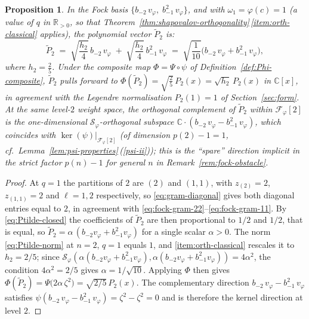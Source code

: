 \documentclass[12pt]{amsart}
\theoremstyle{plain}
\newtheorem{proposition}[theorem]{Proposition}
\theoremstyle{definition}
\newcommand{\CC}{\mathbb{C}}
\newcommand{\RR}{\mathbb{R}}
\newcommand{\Sf}{\mathcal{S}_\varphi} %
\newcommand{\vf}{v_\varphi}           %
\begin{document}
\begin{proposition}
\label{prop:fock-P2}
In the Fock basis $\{b_{-2}\,\vf,\; b_{-1}^2\,\vf\}$, and with
$\omega_1 = \varphi(c) = 1$ (a value of $q$ in $\RR_{>0}$, so that
Theorem~\ref{thm:shapovalov-orthogonality}\,\ref{item:orth-classical}
applies), the polynomial vector $\tilde{P}_2$ is:
\begin{equation}
\label{eq:fock-P2}
  \tilde{P}_2
  \;=\;
  \sqrt{\frac{h_2}{4}}\,b_{-2}\,\vf
  \;+\;
  \sqrt{\frac{h_2}{4}}\,b_{-1}^2\,\vf
  \;=\;
  \sqrt{\frac{1}{10}}\bigl(b_{-2}\,\vf + b_{-1}^2\,\vf\bigr),
\end{equation}
where $h_2 = \frac{2}{5}$. Under the composite map $\Phi=\Psi\circ\psi$
of Definition~\ref{def:Phi-composite}, $\tilde{P}_2$ pulls forward to
$\Phi(\tilde{P}_2) = \sqrt{\tfrac{2}{5}}\,P_2(x) = \sqrt{h_2}\,P_2(x)$
in $\CC[x]$, in agreement with the Legendre normalisation
$P_2(1) = 1$ of Section~\ref{sec:form}.
At the same level-$2$ weight space, the orthogonal complement of
$\tilde{P}_2$ within $\mathcal{F}_\varphi[2]$ is the one-dimensional
$\Sf$-orthogonal subspace
$\CC\cdot(b_{-2}\,\vf - b_{-1}^2\,\vf)$, which coincides with
$\ker(\psi)|_{\mathcal{F}_\varphi[2]}$
(of dimension $p(2)-1 = 1$, cf.\
Lemma~\ref{lem:psi-properties}\,(\ref{psi-ii}));
this is the ``spare'' direction implicit in the strict factor
$p(n)-1$ for general $n$ in Remark~\ref{rem:fock-obstacle}.
\end{proposition}
\begin{proof}
At $q = 1$ the partitions of $2$ are $(2)$ and $(1,1)$, with
$z_{(2)} = 2$, $z_{(1,1)} = 2$ and $\ell = 1, 2$ respectively, so
\eqref{eq:gram-diagonal} gives both diagonal entries equal to $2$, in
agreement with \eqref{eq:fock-gram-22}--\eqref{eq:fock-gram-11}. By
\eqref{eq:Ptilde-closed} the coefficients of $\tilde{P}_2$ are then
proportional to $1/2$ and $1/2$, that is equal, so
$\tilde{P}_2 = \alpha\,(b_{-2}\vf + b_{-1}^2\vf)$ for a single scalar
$\alpha > 0$. The norm \eqref{eq:Ptilde-norm} at $n = 2$, $q = 1$ equals
$1$, and \ref{item:orth-classical} rescales it to $h_2 = 2/5$; since
$\Sf(\alpha(b_{-2}\vf + b_{-1}^2\vf), \alpha(b_{-2}\vf + b_{-1}^2\vf))
= 4\alpha^2$, the condition $4\alpha^2 = 2/5$ gives
$\alpha = 1/\sqrt{10}$.
Applying $\Phi$ then gives
$\Phi(\tilde{P}_2) = \Psi\bigl(2\alpha\,\zeta^2\bigr)
= \sqrt{2/5}\,P_2(x)$.
The complementary direction $b_{-2}\,\vf - b_{-1}^2\,\vf$ satisfies
$\psi(b_{-2}\,\vf - b_{-1}^2\,\vf) = \zeta^2 - \zeta^2 = 0$ and is therefore
the kernel direction at level $2$.
\end{proof}
\end{document}
